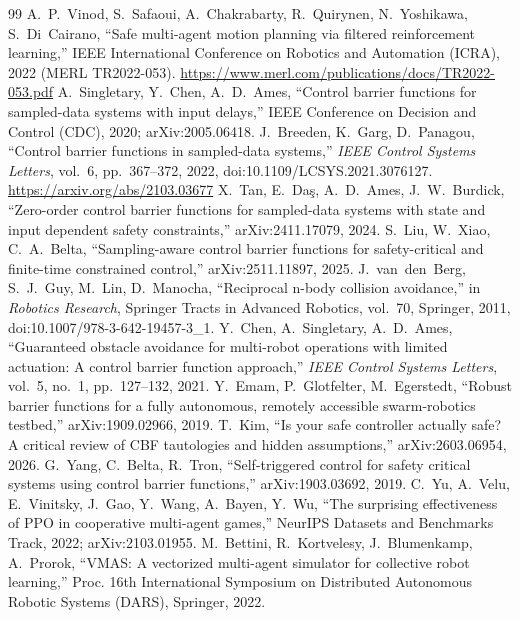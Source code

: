 \documentclass[11pt]{article}
\begin{document}
\begin{thebibliography}{99}
 A.~P.~Vinod, S.~Safaoui, A.~Chakrabarty, R.~Quirynen, N.~Yoshikawa, S.~Di~Cairano, ``Safe multi-agent motion planning via filtered reinforcement learning,'' IEEE International Conference on Robotics and Automation (ICRA), 2022 (MERL TR2022-053). \url{https://www.merl.com/publications/docs/TR2022-053.pdf}
 A.~Singletary, Y.~Chen, A.~D.~Ames, ``Control barrier functions for sampled-data systems with input delays,'' IEEE Conference on Decision and Control (CDC), 2020; arXiv:2005.06418.
 J.~Breeden, K.~Garg, D.~Panagou, ``Control barrier functions in sampled-data systems,'' \emph{IEEE Control Systems Letters}, vol.~6, pp.~367--372, 2022, doi:10.1109/LCSYS.2021.3076127. \url{https://arxiv.org/abs/2103.03677} 
 X.~Tan, E.~Da\c{s}, A.~D.~Ames, J.~W.~Burdick, ``Zero-order control barrier functions for sampled-data systems with state and input dependent safety constraints,'' arXiv:2411.17079, 2024.
 S.~Liu, W.~Xiao, C.~A.~Belta, ``Sampling-aware control barrier functions for safety-critical and finite-time constrained control,'' arXiv:2511.11897, 2025.
 J.~van~den~Berg, S.~J.~Guy, M.~Lin, D.~Manocha, ``Reciprocal n-body collision avoidance,'' in \emph{Robotics Research}, Springer Tracts in Advanced Robotics, vol.~70, Springer, 2011, doi:10.1007/978-3-642-19457-3\_1.
 Y.~Chen, A.~Singletary, A.~D.~Ames, ``Guaranteed obstacle avoidance for multi-robot operations with limited actuation: A control barrier function approach,'' \emph{IEEE Control Systems Letters}, vol.~5, no.~1, pp.~127--132, 2021.
 Y.~Emam, P.~Glotfelter, M.~Egerstedt, ``Robust barrier functions for a fully autonomous, remotely accessible swarm-robotics testbed,'' arXiv:1909.02966, 2019.
 T.~Kim, ``Is your safe controller actually safe? A critical review of CBF tautologies and hidden assumptions,'' arXiv:2603.06954, 2026.
 G.~Yang, C.~Belta, R.~Tron, ``Self-triggered control for safety critical systems using control barrier functions,'' arXiv:1903.03692, 2019.
 C.~Yu, A.~Velu, E.~Vinitsky, J.~Gao, Y.~Wang, A.~Bayen, Y.~Wu, ``The surprising effectiveness of PPO in cooperative multi-agent games,'' NeurIPS Datasets and Benchmarks Track, 2022; arXiv:2103.01955.
 M.~Bettini, R.~Kortvelesy, J.~Blumenkamp, A.~Prorok, ``VMAS: A vectorized multi-agent simulator for collective robot learning,'' Proc. 16th International Symposium on Distributed Autonomous Robotic Systems (DARS), Springer, 2022.

\end{thebibliography}
\end{document}
